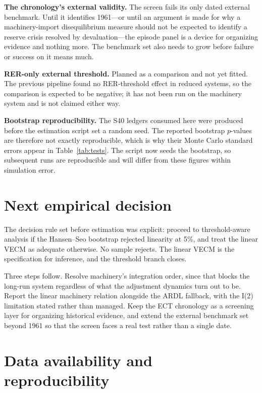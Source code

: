 \documentclass[11pt]{article}
\begin{document}
\textbf{The chronology's external validity.} The screen fails its only dated external benchmark. Until it identifies 1961---or until an argument is made for why a machinery-import disequilibrium measure should not be expected to identify a reserve crisis resolved by devaluation---the episode panel is a device for organizing evidence and nothing more. The benchmark set also needs to grow before failure or success on it means much.

\textbf{RER-only external threshold.} Planned as a comparison and not yet fitted. The previous pipeline found no RER-threshold effect in reduced systems, so the comparison is expected to be negative; it has not been run on the machinery system and is not claimed either way.

\textbf{Bootstrap reproducibility.} The S40 ledgers consumed here were produced before the estimation script set a random seed. The reported bootstrap $p$-values are therefore not exactly reproducible, which is why their Monte Carlo standard errors appear in Table~\ref{tab:tests}. The script now seeds the bootstrap, so subsequent runs are reproducible and will differ from these figures within simulation error.

\FloatBarrier
\section{Next empirical decision}

The decision rule set before estimation was explicit: proceed to threshold-aware analysis if the Hansen--Seo bootstrap rejected linearity at 5\%, and treat the linear VECM as adequate otherwise. No sample rejects. The linear VECM is the specification for inference, and the threshold branch closes.

Three steps follow. Resolve machinery's integration order, since that blocks the long-run system regardless of what the adjustment dynamics turn out to be. Report the linear machinery relation alongside the ARDL fallback, with the I(2) limitation stated rather than managed. Keep the ECT chronology as a screening layer for organizing historical evidence, and extend the external benchmark set beyond 1961 so that the screen faces a real test rather than a single date.

\FloatBarrier
\section*{Data availability and reproducibility}
\end{document}
